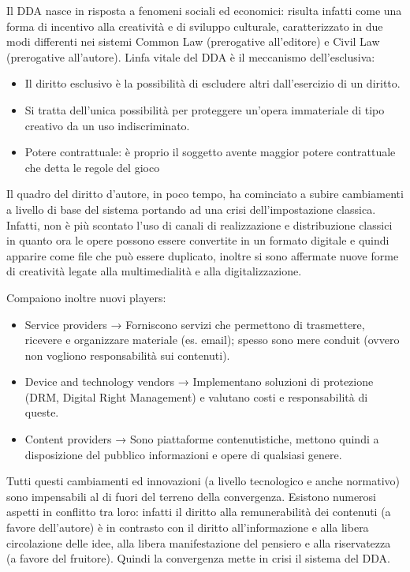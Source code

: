 Il DDA nasce in risposta a fenomeni sociali ed economici: risulta infatti come una forma di incentivo alla creatività e di sviluppo culturale, caratterizzato in due modi differenti nei sistemi Common Law (prerogative all’editore) e Civil Law (prerogative all’autore). Linfa vitale del DDA è il meccanismo dell’esclusiva:
\begin{itemize}
    \item Il diritto esclusivo è la possibilità di escludere altri dall’esercizio di un diritto.
    \item Si tratta dell’unica possibilità per proteggere un’opera immateriale di tipo creativo da un uso indiscriminato.
    \item Potere contrattuale: è proprio il soggetto avente maggior potere contrattuale che detta le regole del gioco
\end{itemize}

Il quadro del diritto d’autore, in poco tempo, ha cominciato a subire cambiamenti a livello di base del sistema portando ad una crisi dell’impostazione classica. Infatti, non è più scontato l’uso di canali di realizzazione e distribuzione classici in quanto ora le opere possono essere convertite in un formato digitale e quindi apparire come file che può essere duplicato, inoltre si sono affermate nuove forme di creatività legate alla multimedialità e alla digitalizzazione.\bigskip


Compaiono inoltre nuovi players:
\begin{itemize}
    \item Service providers → Forniscono servizi che permettono di trasmettere, ricevere e organizzare materiale (es. email); spesso sono mere conduit (ovvero non vogliono responsabilità sui contenuti).
    \item Device and technology vendors → Implementano soluzioni di protezione (DRM, Digital Right Management) e valutano costi e responsabilità di queste.
    \item Content providers → Sono piattaforme contenutistiche, mettono quindi a disposizione del pubblico informazioni e opere di qualsiasi genere.
\end{itemize}

Tutti questi cambiamenti ed innovazioni (a livello tecnologico e anche normativo) sono impensabili al di fuori del terreno della convergenza. Esistono numerosi aspetti in conflitto tra loro: infatti il diritto alla remunerabilità dei contenuti (a favore dell’autore) è in contrasto con il diritto all’informazione e alla libera circolazione delle idee, alla libera manifestazione del pensiero e alla riservatezza (a favore del fruitore). Quindi la convergenza mette in crisi il sistema del DDA. 